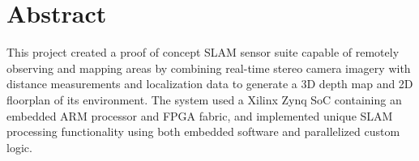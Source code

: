 {}
\section*{Abstract}


This project created a proof of concept SLAM sensor suite capable of remotely observing and mapping areas by combining real-time stereo camera imagery with distance measurements and localization data to generate a 3D depth map and 2D floorplan of its environment. The system used a Xilinx Zynq SoC containing an embedded ARM processor and FPGA fabric, and implemented unique SLAM processing functionality using both embedded software and parallelized custom logic.